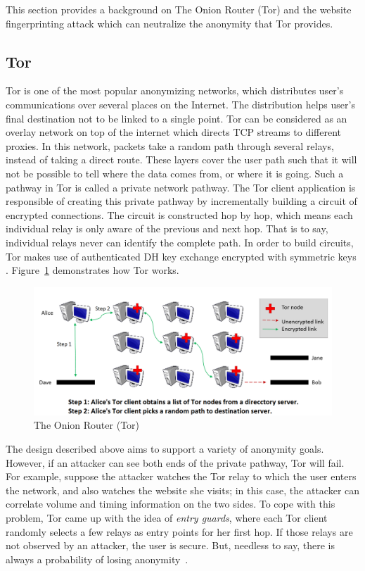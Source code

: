 
This section provides a background on The Onion Router (Tor) and the website fingerprinting attack which can neutralize the anonymity that Tor provides.

\subsection{Tor}

Tor is one of the most popular anonymizing networks, which distributes user's communications over several places on the Internet.
The distribution helps user's final destination not to be linked to a single point. Tor can be considered as an overlay network on top of the internet which directs TCP streams to different proxies.
In this network, packets take a random path through several relays, instead of taking a direct route.
These layers cover the user path such that it will not be possible to tell where the data comes from, or where it is going.
Such a pathway in Tor is called a private network pathway.
The Tor client application is responsible of creating this private pathway by incrementally building a circuit of encrypted connections.
The circuit is constructed hop by hop, which means each individual relay is only aware of the previous and next hop.
That is to say, individual relays never can identify the complete path. In order to build circuits, Tor makes use of authenticated DH key exchange encrypted with symmetric keys \cite{TorPage, dingledine2004tor}. Figure~\ref{fig:tor} demonstrates how Tor works.


\begin{figure}[h]
\includegraphics[width=1\columnwidth]{figures/tor.png}
\centering
\caption{The Onion Router (Tor)~\cite{TorPage}}
\label{fig:tor}
\end{figure}

The design described above aims to support a variety of anonymity goals. However, if an attacker can see both ends of the private pathway, Tor will fail.
For example, suppose the attacker watches the Tor relay to which the user enters the network, and also watches the website she visits; in this case, the attacker can correlate volume and timing information on the two sides.
To cope with this problem, Tor came up with the idea of {\it entry guards}, where each Tor client randomly selects a few relays as entry points for her first hop.
If those relays are not observed by an attacker, the user is secure.
But, needless to say, there is always a probability of losing anonymity~\cite{TorPage}.

